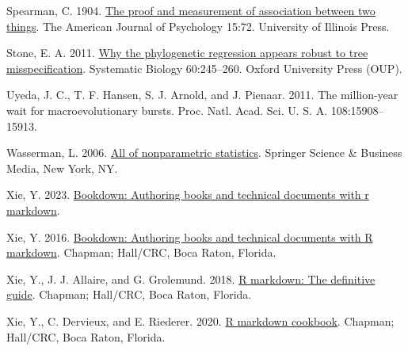 \documentclass[fleqn,10pt,lineno]{wlpeerj} %
\newlength{\cslhangindent}
\newenvironment{CSLReferences}[2] %
 {\begin{list}{}{%
  \setlength{\itemindent}{0pt}
  \setlength{\leftmargin}{0pt}
  \setlength{\parsep}{0pt}
  \ifodd #1
   \setlength{\leftmargin}{\cslhangindent}
   \setlength{\itemindent}{-1\cslhangindent}
  \fi
  \setlength{\itemsep}{#2\baselineskip}}}
 {\end{list}}
\begin{document}
\begin{CSLReferences}{1}{0}
Spearman, C. 1904. \href{https://doi.org/10.2307/1412159}{The proof and measurement of association between two things}. The American Journal of Psychology 15:72. University of Illinois Press.

Stone, E. A. 2011. \href{https://doi.org/10.1093/sysbio/syq098}{Why the phylogenetic regression appears robust to tree misspecification}. Systematic Biology 60:245--260. Oxford University Press (OUP).

Uyeda, J. C., T. F. Hansen, S. J. Arnold, and J. Pienaar. 2011. The million-year wait for macroevolutionary bursts. Proc. Natl. Acad. Sci. U. S. A. 108:15908--15913.

Wasserman, L. 2006. \href{https://doi.org/10.1007/0-387-30623-4}{All of nonparametric statistics}. Springer Science \& Business Media, New York, NY.

Xie, Y. 2023. \href{https://github.com/rstudio/bookdown}{Bookdown: Authoring books and technical documents with r markdown}.

Xie, Y. 2016. \href{https://bookdown.org/yihui/bookdown}{Bookdown: Authoring books and technical documents with {R} markdown}. Chapman; Hall/CRC, Boca Raton, Florida.

Xie, Y., J. J. Allaire, and G. Grolemund. 2018. \href{https://bookdown.org/yihui/rmarkdown}{R markdown: The definitive guide}. Chapman; Hall/CRC, Boca Raton, Florida.

Xie, Y., C. Dervieux, and E. Riederer. 2020. \href{https://bookdown.org/yihui/rmarkdown-cookbook}{R markdown cookbook}. Chapman; Hall/CRC, Boca Raton, Florida.

\end{CSLReferences}
\end{document}
